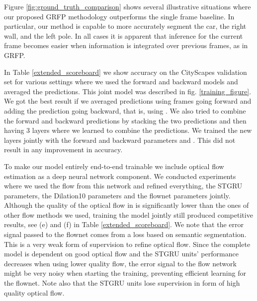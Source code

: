 \documentclass[10pt,twocolumn,letterpaper]{article}
\begin{document}
Figure \ref{fig:ground_truth_comparison} shows several illustrative situations where our proposed GRFP methodology outperforms the single frame baseline. In particular, our method is capable to more accurately segment the car, the right wall, and the left pole. In all cases it is apparent that inference for the current frame becomes easier when information is integrated over previous frames, as in GRFP. 




 In Table \ref{extended_scoreboard} we show accuracy on the CityScapes validation set for various settings where we used the forward and backward models and averaged the predictions. This joint model was described in fig. \ref{training_figure}. We got the best result if we averaged predictions using  frames going forward and adding the prediction going backward, that is, using . We also tried to combine the forward and backward predictions by stacking the two predictions and then having 3 layers where we learned to combine the predictions. We trained the new layers jointly with the forward and backward parameters  and . This did not result in any improvement in accuracy.

 To make our model entirely end-to-end trainable we include optical flow estimation as a deep neural network component\cite{fischer2015flownet}. We conducted experiments where we used the flow from this network and refined everything, the STGRU parameters, the Dilation10 parameters and the flownet parameters jointly. Although the quality of the optical flow in \cite{fischer2015flownet} is significantly lower than the ones of other flow methods we used, training the model jointly still produced competitive results, see (e) and (f) in Table \ref{extended_scoreboard}. We note that the error signal passed to the flownet comes from a loss based on semantic segmentation. This is a very weak form of supervision to refine optical flow. Since the complete model is dependent on good optical flow and the STGRU units' performance decreases when using lower quality flow, the error signal to the flow network might be very noisy when starting the training, preventing efficient learning for the flownet. Note also that the STGRU units lose supervision in form of high quality optical flow. 
\end{document}
